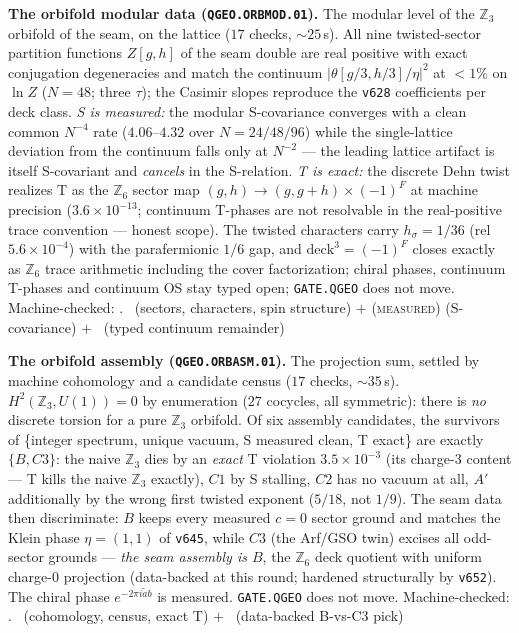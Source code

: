 \par\smallskip\noindent\textbf{The orbifold modular data
(\texttt{QGEO.ORBMOD.01}).}
The modular level of the $\mathbb{Z}_3$ orbifold of the seam, on the
lattice ($17$ checks, ${\sim}25$\,s).  All nine twisted-sector
partition functions $Z[g,h]$ of the seam double are real positive
with exact conjugation degeneracies and match the continuum
$|\theta[g/3,h/3]/\eta|^2$ at $<1\%$ on $\ln Z$ ($N=48$; three
$\tau$); the Casimir slopes reproduce the \texttt{v628} coefficients
per deck class.  \emph{S is measured:} the modular S-covariance
converges with a clean common $N^{-4}$ rate ($4.06$--$4.32$ over
$N=24/48/96$) while the single-lattice deviation from the continuum
falls only at $N^{-2}$ --- the leading lattice artifact is itself
S-covariant and \emph{cancels} in the S-relation.  \emph{T is exact:}
the discrete Dehn twist realizes T as the $\mathbb{Z}_6$ sector map
$(g,h)\to(g,g{+}h)\times(-1)^F$ at machine precision
($3.6\times10^{-13}$; continuum T-phases are not resolvable in the
real-positive trace convention --- honest scope).  The twisted
characters carry $h_\sigma=1/36$ (rel $5.6\times10^{-4}$) with the
parafermionic $1/6$ gap, and $\mathrm{deck}^3=(-1)^F$ closes exactly
as $\mathbb{Z}_6$ trace arithmetic including the cover factorization;
chiral phases, continuum T-phases and continuum OS stay typed open;
\texttt{GATE.QGEO} does not move.
Machine-checked: .
\mE\ (sectors, characters, spin structure) $+$ (\textsc{measured})
(S-covariance) $+$ \mC\ (typed continuum remainder)
\par\smallskip

\par\smallskip\noindent\textbf{The orbifold assembly
(\texttt{QGEO.ORBASM.01}).}
The projection sum, settled by machine cohomology and a candidate
census ($17$ checks, ${\sim}35$\,s).  $H^2(\mathbb{Z}_3,U(1))=0$ by
enumeration ($27$ cocycles, all symmetric): there is \emph{no}
discrete torsion for a pure $\mathbb{Z}_3$ orbifold.  Of six assembly
candidates, the survivors of \{integer spectrum, unique vacuum, S
measured clean, T exact\} are exactly $\{B, C3\}$: the naive
$\mathbb{Z}_3$ dies by an \emph{exact} T violation $3.5\times10^{-3}$
(its charge-$3$ content --- T kills the naive $\mathbb{Z}_3$
exactly), $C1$ by S stalling, $C2$ has no vacuum at all, $A'$
additionally by the wrong first twisted exponent ($5/18$, not
$1/9$).  The seam data then discriminate: $B$ keeps every measured
$c=0$ sector ground and matches the Klein phase $\eta=(1,1)$ of
\texttt{v645}, while $C3$ (the Arf/GSO twin) excises all odd-sector
grounds --- \emph{the seam assembly is $B$}, the $\mathbb{Z}_6$ deck
quotient with uniform charge-$0$ projection (data-backed at this
round; hardened structurally by \texttt{v652}).  The chiral phase
$e^{-2\pi i\tilde a b}$ is measured.  \texttt{GATE.QGEO} does not
move.
Machine-checked: .
\mE\ (cohomology, census, exact T) $+$ \mC\ (data-backed B-vs-C3
pick)
\par\smallskip

